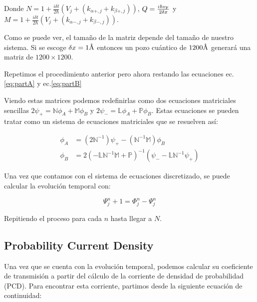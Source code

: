     \noindent Donde $N =1 + \frac{i\delta t}{2\hbar} \left( V_j + \left(k_{\alpha+,j}+k_{\beta+,j}\right)\right)$, $Q=\frac{i\hbar v_{\mbox{\tiny F}}}{2\delta x}$ y $M =1 + \frac{i\delta t}{2\hbar}\left( V_j + \left(k_{\alpha-,j}+k_{\beta-,j}\right)\right)$.
    
    Como se puede ver, el tamaño de la matriz depende del tamaño de nuestro sistema.
    Si se escoge $\delta x = 1\textup{\AA}$ entonces un pozo cuántico de $1200\textup{\AA}$ generará una matriz de $1200\times1200$.

    Repetimos el procedimiento anterior pero ahora restando las ecuaciones ec.\eqref{eq:partA} y ec.\eqref{eq:partB}

    Viendo estas matrices podemos redefinirlas como dos ecuaciones matriciales sencillas $2\psi_+=\mathbb{N}\phi_A+\mathbb{M}\phi_B$ y $2\psi_-=\mathbb{L}\phi_A+\mathbb{P}\phi_B$.
    Estas ecuaciones se pueden tratar como un sistema de ecuaciones matriciales que se resuelven así:

    \begin{align}
        \label{eq:sistemaMatricial}
        \phi_A&=(2\mathbb{N}^{-1})\psi_+-(\mathbb{N}^{-1}\mathbb{M})\phi_B\nonumber\\
        \phi_B&=2(-\mathbb{L}\mathbb{N}^{-1}\mathbb{M}+\mathbb{P})^{-1}(\psi_--\mathbb{L}\mathbb{N}^{-1}\psi_+)
    \end{align}

    Una vez que contamos con el sistema de ecuaciones discretizado, se puede calcular la evolución temporal con:

    \begin{equation}
        \label{eq:siguienteTiempo}
        \Psi_j^n+1=\Phi_j^n-\Psi_j^n
    \end{equation}

    Repitiendo el proceso para cada $n$ hasta llegar a $N$.


    \subsection{Probability Current Density}\label{subsec:probability-current-density}

    Una vez que se cuenta con la evolución temporal, podemos calcular su coeficiente de transmisión a partir del cálculo de la corriente de densidad de probabilidad (PCD).
    Para encontrar esta corriente, partimos desde la siguiente ecuación de continuidad:

